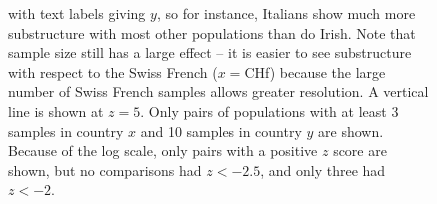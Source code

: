 \documentclass{article}
\begin{document}
\begin{figure}[!htp]
\begin{center}
{    with text labels giving $y$,
    so for instance, Italians show much more substructure with most other populations than do Irish.
    Note that sample size still has a large effect -- it is easier to see substructure with respect to the Swiss French ($x=$CHf)
    because the large number of Swiss French samples allows greater resolution.
    A vertical line is shown at $z=5$.
    Only pairs of populations with at least 3 samples in country $x$ and 10 samples in country $y$ are shown.
    Because of the log scale, only pairs with a positive $z$ score are shown, but no comparisons had $z < -2.5$,
    and only three had $z<-2$.
      \label{sfig:substructure_summaries}
    }
  \end{center}
\end{figure}

\begin{figure}[!htp]
  \begin{center}
    

\end{center}
\end{figure}
\end{document}
